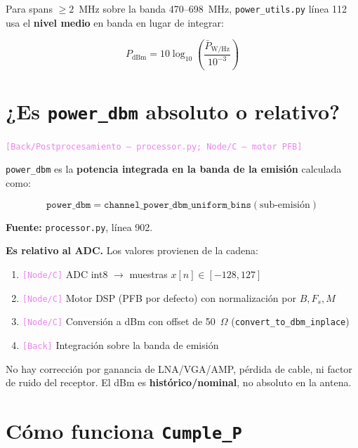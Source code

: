 \documentclass[11pt,a4paper]{article}
\newcommand{\where}[1]{\textcolor{violet}{\texttt{[#1]}}}
\begin{document}
Para spans $\geq 2$~MHz sobre la banda 470--698~MHz, \texttt{power\_utils.py} línea 112 usa el \textbf{nivel medio} en banda en lugar de integrar:

\begin{equation}
P_{\text{dBm}} = 10 \log_{10}\!\left(\frac{\bar{P}_{\text{W/Hz}}}{10^{-3}}\right)
\label{eq:mean_power}
\end{equation}

\section{¿Es \texttt{power\_dbm} absoluto o relativo?}
\label{sec:power_dbm}

\where{Back/Postprocesamiento — \texttt{processor.py}; Node/C — motor PFB}

\texttt{power\_dbm} es la \textbf{potencia integrada en la banda de la emisión} calculada como:

\begin{equation}
\texttt{power\_dbm} = \texttt{channel\_power\_dbm\_uniform\_bins}(\text{sub-emisión})
\label{eq:power_dbm}
\end{equation}

\textbf{Fuente:} \texttt{processor.py}, línea 902.

\textbf{Es relativo al ADC.} Los valores provienen de la cadena:

\begin{enumerate}
\item \where{Node/C} ADC int8 $\to$ muestras $x[n] \in [-128, 127]$
\item \where{Node/C} Motor DSP (PFB por defecto) con normalización por $B, F_s, M$
\item \where{Node/C} Conversión a dBm con offset de 50~$\Omega$ (\texttt{convert\_to\_dbm\_inplace})
\item \where{Back} Integración sobre la banda de emisión
\end{enumerate}

No hay corrección por ganancia de LNA/VGA/AMP, pérdida de cable, ni factor de ruido del receptor. El dBm es \textbf{histórico/nominal}, no absoluto en la antena.

\section{Cómo funciona \texttt{Cumple\_P}}
\label{sec:cumple_p}
\end{document}
